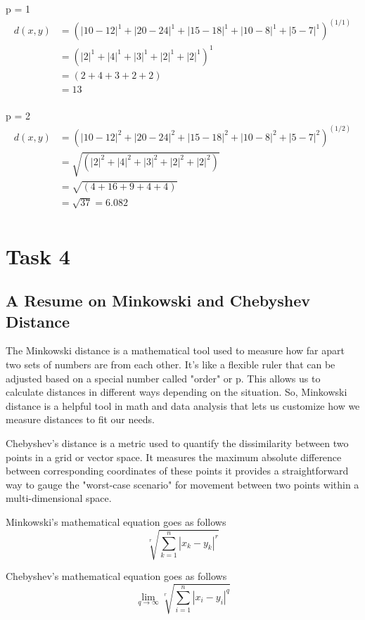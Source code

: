 \documentclass[12pt,titlepage]{article}
\begin{document}
p = 1
\begin{align*}
    d(x,y) &= (|10-12|^1+|20-24|^1+|15-18|^1+|10-8|^1+|5-7|^1)^{(1/1)} \\
    &= (|2|^1+|4|^1+|3|^1+|2|^1+|2|^1)^{1} \\
    &= (2+4+3+2+2) \\
    &= 13 \\
\end{align*}

p = 2
\begin{align*}
    d(x,y) &= (|10-12|^2+|20-24|^2+|15-18|^2+|10-8|^2+|5-7|^2)^{(1/2)} \\
    &= \sqrt{(|2|^2+|4|^2+|3|^2+|2|^2+|2|^2)} \\
    &= \sqrt{(4+16+9+4+4)} \\
    &= \sqrt{37} = 6.082\\
\end{align*}

\newpage

\section*{Task 4}

\subsection*{A Resume on Minkowski and Chebyshev Distance}
The Minkowski distance is a mathematical tool used to measure how far apart two sets of numbers are from each other. It's like a flexible ruler that can be adjusted based on a special number called "order" or p. This allows us to calculate distances in different ways depending on the situation. So, Minkowski distance is a helpful tool in math and data analysis that lets us customize how we measure distances to fit our needs.

Chebyshev's distance is a metric used to quantify the dissimilarity between two points in a grid or vector space. It measures the maximum absolute difference between corresponding coordinates of these points it provides a straightforward way to gauge the "worst-case scenario" for movement between two points within a multi-dimensional space.

Minkowski's mathematical equation goes as follows
\begin{equation*}
    \sqrt[r]{\sum_{k=1}^{n}|x_k-y_k|^r}
\end{equation*}

Chebyshev's mathematical equation goes as follows
\begin{equation*}
    \lim_{q\rightarrow\infty}\sqrt[r]{\sum_{i=1}^{n}|x_i-y_i|^q}
\end{equation*}
\end{document}
